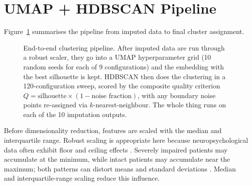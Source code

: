 \section{UMAP + HDBSCAN Pipeline}\label{sec:pipeline}

Figure~\ref{fig:pipeline_diagram} summarises the pipeline from imputed data to final cluster assignment.

\begin{figure}[htbp]
\centering
{}
\caption[Pipeline overview]{End-to-end clustering pipeline. After imputed data are run through a robust scaler, they go into a UMAP hyperparameter grid (10 random seeds for each of 9 configurations) and the embedding with the best silhouette is kept. HDBSCAN then does the clustering in a 120-configuration sweep, scored by the composite quality criterion $Q = \text{silhouette} \times (1 - \text{noise fraction})$, with any boundary noise points re-assigned via $k$-nearest-neighbour. The whole thing runs on each of the 10 imputation outputs.}
\label{fig:pipeline_diagram}
\end{figure}

Before dimensionality reduction, features are scaled with the median and interquartile range. Robust scaling is appropriate here because neuropsychological data often exhibit floor and ceiling effects \parencite{bellio2020analyzing}. Severely impaired patients may accumulate at the minimum, while intact patients may accumulate near the maximum; both patterns can distort means and standard deviations \parencite{pinsky2023mad}. Median and interquartile-range scaling reduce this influence.

